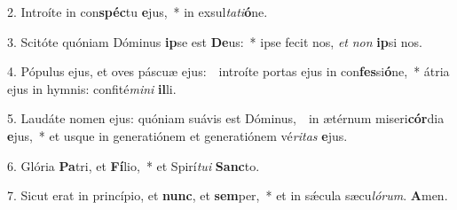 
2. Introíte in con\textbf{spéc}tu \textbf{e}jus,~* in exsul\textit{ta}\textit{ti}\textbf{ó}ne.

3. Scitóte quóniam Dóminus \textbf{ip}se est \textbf{De}us:~* ipse fecit nos, \textit{et} \textit{non} \textbf{ip}si nos.

4. Pópulus ejus, et oves páscuæ ejus:~\GreDagger\ introíte portas ejus in con\textbf{fes}si\textbf{ó}ne,~* átria ejus in hymnis: confité\textit{mi}\textit{ni} \textbf{il}li.

5. Laudáte nomen ejus: quóniam suávis est Dóminus,~\GreDagger\ in ætérnum miseri\textbf{cór}dia \textbf{e}jus,~* et usque in generatiónem et generatiónem vé\textit{ri}\textit{tas} \textbf{e}jus.

6. Glória \textbf{Pa}tri, et \textbf{Fí}lio,~* et Spirí\textit{tu}\textit{i} \textbf{Sanc}to.

7. Sicut erat in princípio, et \textbf{nunc}, et \textbf{sem}per,~* et in s\'{\ae}cula sæcu\textit{ló}\textit{rum}. \textbf{A}men.